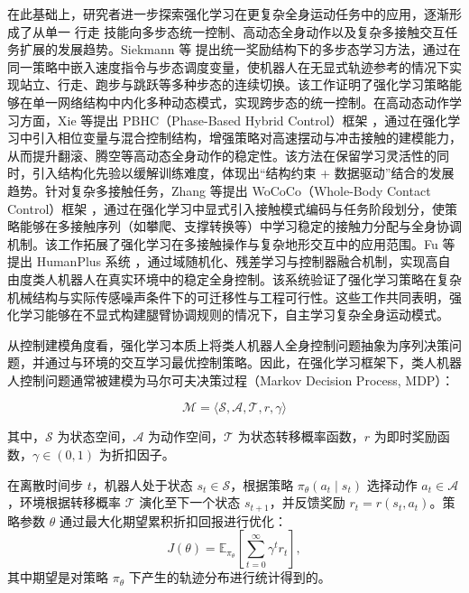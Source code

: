 在此基础上，研究者进一步探索强化学习在更复杂全身运动任务中的应用，逐渐形成了从单一 行走 技能向多步态统一控制、高动态全身动作以及复杂多接触交互任务扩展的发展趋势。Siekmann 等 \cite{Siekmann2021AllGaits} 提出统一奖励结构下的多步态学习方法，通过在同一策略中嵌入速度指令与步态调度变量，使机器人在无显式轨迹参考的情况下实现站立、行走、跑步与跳跃等多种步态的连续切换。该工作证明了强化学习策略能够在单一网络结构中内化多种动态模式，实现跨步态的统一控制。在高动态动作学习方面，Xie 等提出 PBHC（Phase-Based Hybrid Control）框架 \cite{Xie2025PBHC}，通过在强化学习中引入相位变量与混合控制结构，增强策略对高速摆动与冲击接触的建模能力，从而提升翻滚、腾空等高动态全身动作的稳定性。该方法在保留学习灵活性的同时，引入结构化先验以缓解训练难度，体现出“结构约束 + 数据驱动”结合的发展趋势。针对复杂多接触任务，Zhang 等提出 WoCoCo（Whole-Body Contact Control）框架 \cite{Zhang2024WoCoCo}，通过在强化学习中显式引入接触模式编码与任务阶段划分，使策略能够在多接触序列（如攀爬、支撑转换等）中学习稳定的接触力分配与全身协调机制。该工作拓展了强化学习在多接触操作与复杂地形交互中的应用范围。Fu 等提出 HumanPlus 系统 \cite{Fu2024HumanPlus}，通过域随机化、残差学习与控制器融合机制，实现高自由度类人机器人在真实环境中的稳定全身控制。该系统验证了强化学习策略在复杂机械结构与实际传感噪声条件下的可迁移性与工程可行性。这些工作共同表明，强化学习能够在不显式构建腿臂协调规则的情况下，自主学习复杂全身运动模式。

从控制建模角度看，强化学习本质上将类人机器人全身控制问题抽象为序列决策问题，并通过与环境的交互学习最优控制策略。因此，在强化学习框架下，类人机器人控制问题通常被建模为马尔可夫决策过程（Markov Decision Process, MDP）：

\begin{equation}
	\mathcal{M} = \langle \mathcal{S}, \mathcal{A}, \mathcal{T}, r, \gamma \rangle
\end{equation}

其中，$\mathcal{S}$ 为状态空间，$\mathcal{A}$ 为动作空间，$\mathcal{T}$ 为状态转移概率函数，$r$ 为即时奖励函数，$\gamma \in (0,1)$ 为折扣因子。

在离散时间步 $t$，机器人处于状态 $s_t \in \mathcal{S}$，根据策略 $\pi_\theta(a_t \mid s_t)$ 选择动作 $a_t \in \mathcal{A}$，环境根据转移概率 $\mathcal{T}$ 演化至下一个状态 $s_{t+1}$，并反馈奖励 $r_t = r(s_t,a_t)$。策略参数 $\theta$ 通过最大化期望累积折扣回报进行优化：
\begin{equation}
	J(\theta) = 
	\mathbb{E}_{\pi_\theta}
	\left[
	\sum_{t=0}^{\infty} \gamma^t r_t
	\right],
\end{equation}
其中期望是对策略 $\pi_\theta$ 下产生的轨迹分布进行统计得到的。

